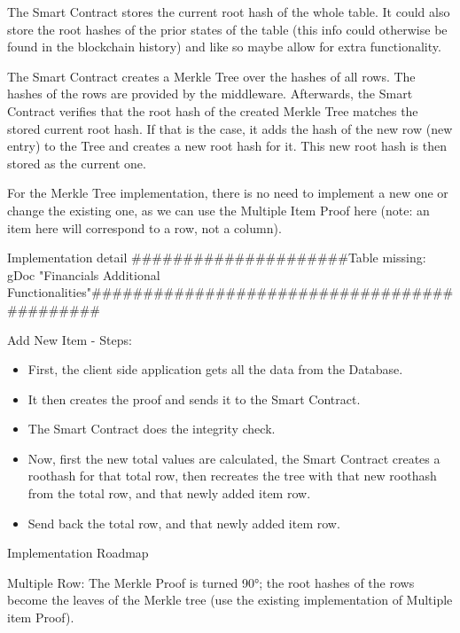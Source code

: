 The Smart Contract stores the current root hash of the whole table. It could also store the root hashes of the prior states of the table (this info could otherwise be found in the blockchain history) and like so maybe allow for extra functionality.

The Smart Contract creates a Merkle Tree over the hashes of all rows. The hashes of the rows are provided by the middleware. Afterwards, the Smart Contract verifies that the root hash of the created Merkle Tree matches the stored current root hash. If that is the case, it adds the hash of the new row (new entry) to the Tree and creates a new root hash for it. This new root hash is then stored as the current one.

For the Merkle Tree implementation, there is no need to implement a new one or change the existing one, as we can use the Multiple Item Proof here (note: an item here will correspond to a row, not a column).

Implementation detail
#####################Table missing: gDoc "Financials Additional Functionalities"############################################

Add New Item - Steps:
\begin{itemize}
\item First, the client side application gets all the data from the Database.
\item It then creates the proof and sends it to the Smart Contract.
\item The Smart Contract does the integrity check.
\item Now, first the new total values are calculated, the Smart Contract creates a roothash for that total row, then recreates the tree with that new roothash from the total row, and that newly added item row.
\item Send back the total row, and that newly added item row.
\end{itemize}

Implementation Roadmap

Multiple Row:
The Merkle Proof is turned 90°; the root hashes of the rows become the leaves of the Merkle tree (use the existing implementation of Multiple item Proof).

